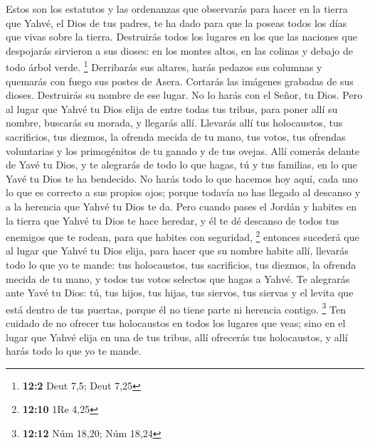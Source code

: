 \begin{paracol}{2}
 Estos son los estatutos y las ordenanzas que observarás
para hacer en la tierra que Yahvé, el Dios de tus padres, te ha dado
para que la poseas todos los días que vivas sobre la tierra.
 Destruirás todos los lugares en los que las naciones que
despojarás sirvieron a sus dioses: en los montes altos, en las colinas y
debajo de todo árbol verde. \footnote{\textbf{12:2} Deut 7,5; Deut 7,25}
 Derribarás sus altares, harás pedazos sus columnas y
quemarás con fuego sus postes de Asera. Cortarás las imágenes grabadas
de sus dioses. Destruirás su nombre de ese lugar.  No lo
harás con el Señor, tu Dios.  Pero al lugar que Yahvé tu
Dios elija de entre todas tus tribus, para poner allí su nombre,
buscarás su morada, y llegarás allí.  Llevarás allí tus
holocaustos, tus sacrificios, tus diezmos, la ofrenda mecida de tu mano,
tus votos, tus ofrendas voluntarias y los primogénitos de tu ganado y de
tus ovejas.  Allí comerás delante de Yavé tu Dios, y te
alegrarás de todo lo que hagas, tú y tus familias, en lo que Yavé tu
Dios te ha bendecido.  No harás todo lo que hacemos hoy
aquí, cada uno lo que es correcto a sus propios ojos; 
porque todavía no has llegado al descanso y a la herencia que Yahvé tu
Dios te da.  Pero cuando pases el Jordán y habites en la
tierra que Yahvé tu Dios te hace heredar, y él te dé descanso de todos
tus enemigos que te rodean, para que habites con seguridad, \footnote{\textbf{12:10}
  1Re 4,25}  entonces sucederá que al lugar que Yahvé tu
Dios elija, para hacer que su nombre habite allí, llevarás todo lo que
yo te mande: tus holocaustos, tus sacrificios, tus diezmos, la ofrenda
mecida de tu mano, y todos tus votos selectos que hagas a Yahvé.
 Te alegrarás ante Yavé tu Dios: tú, tus hijos, tus
hijas, tus siervos, tus siervas y el levita que está dentro de tus
puertas, porque él no tiene parte ni herencia contigo. \footnote{\textbf{12:12}
  Núm 18,20; Núm 18,24}  Ten cuidado de no ofrecer tus
holocaustos en todos los lugares que veas;  sino en el
lugar que Yahvé elija en una de tus tribus, allí ofrecerás tus
holocaustos, y allí harás todo lo que yo te mande.


\end{paracol}
